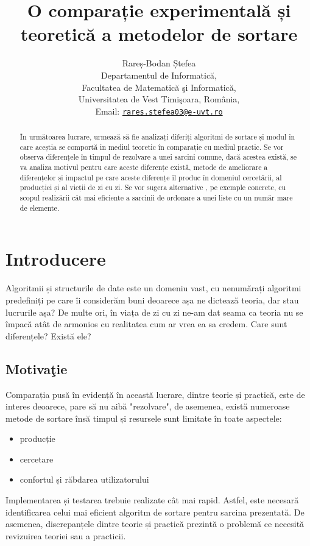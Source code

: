 \documentclass[12pt]{article}
\title{O comparație experimentală și
teoretică a metodelor de sortare}
\author{Rareș-Bodan Ștefea\\
Departamentul de Informatică,\\
Facultatea de Matematică şi Informatică,\\
Universitatea de Vest Timişoara, România, \\
Email: \href{mailto:rares.stefea03@e-uvt.ro}{\texttt{rares.stefea03@e-uvt.ro}}
}
\begin{document}
\maketitle
\begin{abstract}
În următoarea lucrare, urmează să fie analizați diferiți algoritmi de sortare și modul în care aceștia se comportă in mediul teoretic în comparație cu mediul practic. Se vor observa diferențele în timpul de rezolvare a unei sarcini comune, dacă acestea există, se va analiza motivul pentru care aceste diferențe există, metode de ameliorare a diferențelor  și impactul pe care aceste diferențe îl produc în domeniul cercetării, al producției și al vieții de zi cu zi. Se vor sugera alternative , pe exemple concrete, cu scopul realizării cât mai eficiente a sarcinii de ordonare a unei liste cu un număr mare de elemente.
\end{abstract}

\pagebreak
\tableofcontents
\listoftables
\pagebreak


\section{Introducere}
 \label{sec:introducere}

 Algoritmii și structurile de date este un domeniu vast, cu nenumărați algoritmi predefiniți pe care îi considerăm buni deoarece așa ne dictează teoria, dar stau lucrurile așa? De multe ori, în viața de zi cu zi ne-am dat seama ca teoria nu se împacă atât de armonios cu realitatea cum ar vrea ea sa credem. Care sunt diferențele? Există ele?

\subsection{Motivaţie}

Comparația pusă în evidență în această lucrare, dintre teorie și practică, este de interes deoarece, pare să nu aibă "rezolvare", de asemenea, există numeroase metode de sortare însă timpul și resursele sunt limitate în toate aspectele:
\begin{itemize}
\item producție
\item cercetare 
\item confortul și răbdarea utilizatorului
\end{itemize}
Implementarea și testarea trebuie realizate cât mai rapid. Astfel, este necesară identificarea celui mai eficient algoritm de sortare pentru sarcina prezentată. De asemenea, discrepanțele dintre teorie și practică prezintă o problemă ce necesită revizuirea teoriei sau a practicii.
\end{document}
